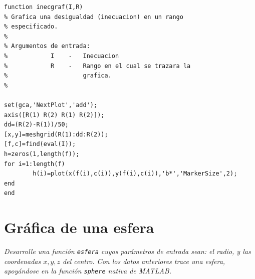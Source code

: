 \begin{verbatim}
function inecgraf(I,R)
% Grafica una desigualdad (inecuacion) en un rango
% especificado.
%
% Argumentos de entrada:
%            I    -   Inecuacion
%            R    -   Rango en el cual se trazara la
%                     grafica.
%

set(gca,'NextPlot','add'); 
axis([R(1) R(2) R(1) R(2)]);
dd=(R(2)-R(1))/50;
[x,y]=meshgrid(R(1):dd:R(2));
[f,c]=find(eval(I));
h=zeros(1,length(f));
for i=1:length(f)
        h(i)=plot(x(f(i),c(i)),y(f(i),c(i)),'b*','MarkerSize',2);
end
end
\end{verbatim}

\section{Gráfica de una esfera}

\textit{Desarrolle una función \texttt{esfera} cuyos parámetros de entrada sean: el radio, y las coordenadas $x,y,z$ 
del centro. Con los datos anteriores trace una esfera, apoyándose en la función \texttt{sphere} nativa de MATLAB.}



